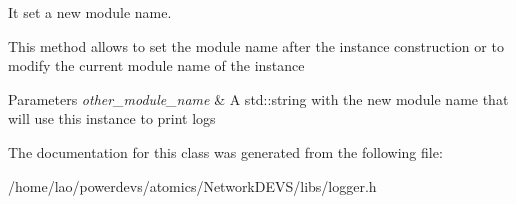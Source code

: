 It set a new module name. 

This method allows to set the module name after the instance construction or to modify the current module name of the instance


\begin{DoxyParams}{Parameters}
{\em other\+\_\+module\+\_\+name} & A std\+::string with the new module name that will use this instance to print logs \\
\hline
\end{DoxyParams}


The documentation for this class was generated from the following file\+:\begin{DoxyCompactItemize}
\item 
/home/lao/powerdevs/atomics/\+Network\+D\+E\+V\+S/libs/logger.\+h\end{DoxyCompactItemize}
